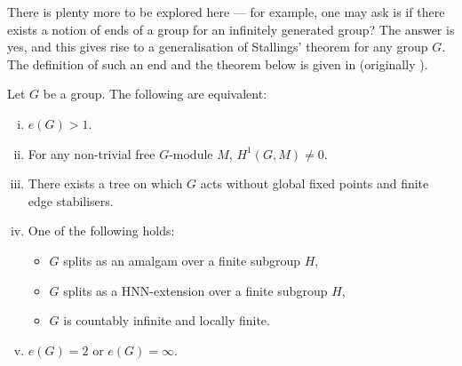 There is plenty more to be explored here --- for example, one may ask is if there exists a notion of ends of a group for an infinitely generated group?
The answer is yes, and this gives rise to a generalisation of Stallings' theorem for any group \(G\). The definition of such an end and the theorem below is given in \cite{phdthesis} (originally \cite{D89}).

\begin{theorem}
     Let \(G\) be a group. The following are equivalent:
     \begin{enumerate}[(i)]
         \item \(e(G) > 1\).
         \item For any non-trivial free \(G\)-module \(M\), \(H^1(G,M) \neq 0\).
         \item There exists a tree on which \(G\) acts without global fixed points and finite edge stabilisers.
         \item One of the following holds:
         \begin{itemize}
             \item \(G\) splits as an amalgam over a finite subgroup \(H\),
             \item \(G\) splits as a HNN-extension over a finite subgroup \(H\),
             \item \(G\) is countably infinite and locally finite.
         \end{itemize}
         \item \(e(G) = 2\) or \(e(G) = \infty\).
     \end{enumerate}
\end{theorem}
